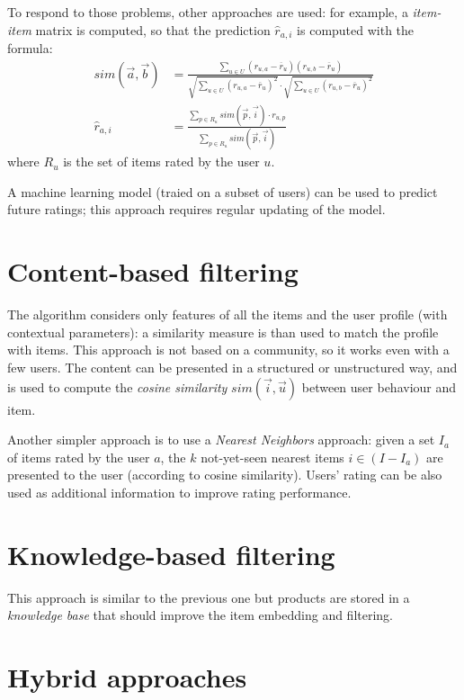 \documentclass[11pt, a4page]{article}
\begin{document}
To respond to those problems, other approaches are used: for example, a \textit{item-item} matrix is computed, so that the prediction $\hat{r}_{a, i}$ is computed with the formula:
\begin{align*}
  sim(\vec{a}, \vec{b}) &= \frac{\sum_{u \in U}(r_{u, a} - \overline{r}_u)(r_{u, b} - \overline{r}_u)}{\sqrt{\sum_{u \in U}(r_{u, a} - \overline{r}_u)^2} \cdot \sqrt{\sum_{u \in U}(r_{u, b} - \overline{r}_u)^2}} \\
  \hat{r}_{a, i} &= \frac{\sum_{p \in R_u} sim(\vec{p}, \vec{i}) \cdot r_{u, p}}{\sum_{p \in R_u} sim(\vec{p}, \vec{i})}
\end{align*}
where $R_u$ is the set of items rated by the user $u$.

A machine learning model (traied on a subset of users) can be used to predict future ratings; this approach requires regular updating of the model.


\section{Content-based filtering}
The algorithm considers only features of all the items and the user profile (with contextual parameters): a similarity measure is than used to match the profile with items.
This approach is not based on a community, so it works even with a few users.
The content can be presented in a structured or unstructured way, and is used to compute the \textit{cosine similarity} $sim(\vec{i}, \vec{u})$ between user behaviour and item.

Another simpler approach is to use a \textit{Nearest Neighbors} approach: given a set $I_a$ of items rated by the user $a$, the $k$ not-yet-seen nearest items $i \in (I - I_a)$ are presented to the user (according to cosine similarity).
Users' rating can be also used as additional information to improve rating performance.


\section{Knowledge-based filtering}
This approach is similar to the previous one but products are stored in a \textit{knowledge base} that should improve the item embedding and filtering.


\section{Hybrid approaches}
\end{document}
